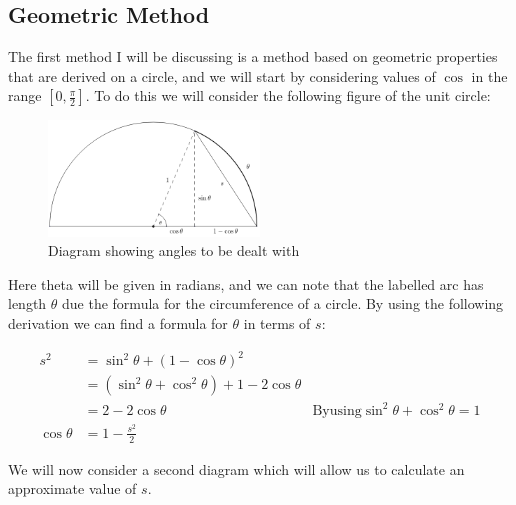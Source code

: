 \subsection{Geometric Method}
\label{SUB_"Trig Geometric Method"}

\theoremstyle{plain}
\newtheorem{Geo Trig Prop 1}{Proposition}[subsection]
\newtheorem{Geo Trig Prop 2}[Geo Trig Prop 1]{Proposition}
\newtheorem{Geo Trig Prop 3}[Geo Trig Prop 1]{Proposition}

The first method I will be discussing is a method based on geometric properties that are derived on a circle, and we will start by considering values of \(\cos\) in the range \([0, \frac{\pi}{2}]\). To do this we will consider the following figure of the unit circle:

\begin{figure}[!ht]
	\label{FIG_"Geometric Trig 1"}
	\caption{Diagram showing angles to be dealt with}
	\centering
	\includegraphics[width=0.5\textwidth]{"./Diagrams/Geometric Trig Diagram 1"}
\end{figure}

Here theta will be given in radians, and we can note that the labelled arc has length \(\theta\) due the formula for the circumference of a circle. By using the following derivation we can find a formula for \(\theta\) in terms of \(s\):

\begin{displaymath}
\begin{align*}
	s^2 &= \sin^2\theta + (1 - \cos\theta)^2\\
	    &= (\sin^2\theta + \cos^2\theta) + 1 - 2\cos\theta\\
		&= 2 - 2 \cos\theta 
			&\mathrm{By using } \sin^2\theta + \cos^2\theta = 1\\
	\cos\theta &= 1 - \frac{s^2}{2}
\end{align*}
\end{displaymath}

We will now consider a second diagram which will allow us to calculate an approximate value of \(s\).


